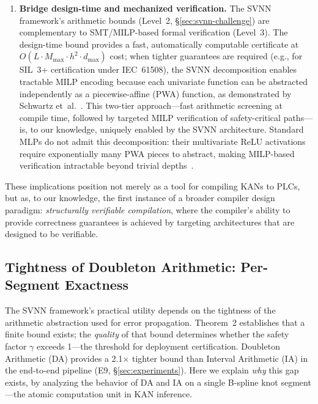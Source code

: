 \begin{enumerate}
    \item \textbf{Bridge design-time and mechanized verification.}
          The SVNN framework's arithmetic bounds (Level~2,
          {\S}\ref{sec:svnn-challenge}) are complementary to SMT/MILP-based
          formal verification (Level~3). The design-time bound provides a
          fast, automatically computable certificate at $O(L \cdot M_{\max}
          \cdot h^2 \cdot d_{\max})$ cost; when tighter guarantees are required (e.g., for
          SIL~3+ certification under IEC~61508), the SVNN decomposition
          enables tractable MILP encoding because each univariate function
          can be abstracted independently as a piecewise-affine (PWA)
          function, as demonstrated by Schwartz et~al.~\cite{schwartz2026optimal}.
          This two-tier approach---fast arithmetic screening at compile time,
          followed by targeted MILP verification of safety-critical paths---
          is, to our knowledge, uniquely enabled by the SVNN architecture. Standard MLPs do not
          admit this decomposition: their multivariate ReLU activations
          require exponentially many PWA pieces to abstract, making MILP-based
          verification intractable beyond trivial depths~\cite{schwartz2026optimal}.
\end{enumerate}

These implications position \neuroplc not merely as a tool for compiling
KANs to PLCs, but as, to our knowledge, the first instance of a broader compiler design
paradigm: \textit{structurally verifiable compilation}, where the compiler's
ability to provide correctness guarantees is achieved by targeting
architectures that are designed to be verifiable.

\subsection{Tightness of Doubleton Arithmetic: Per-Segment Exactness}
\label{sec:da-segment-exactness}

The SVNN framework's practical utility depends on the tightness of the
arithmetic abstraction used for error propagation. Theorem~2 establishes
that a finite bound exists; the \emph{quality} of that bound determines
whether the safety factor $\gamma$ exceeds 1---the threshold for
deployment certification. Doubleton Arithmetic (DA) provides a 2.1$\times$
tighter bound than Interval Arithmetic (IA) in the end-to-end pipeline
(E9, {\S}\ref{sec:experiments}). Here we explain \emph{why} this gap
exists, by analyzing the behavior of DA and IA on a single B-spline
knot segment---the atomic computation unit in KAN inference.

